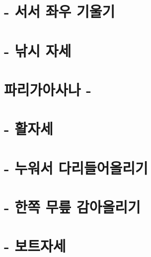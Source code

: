 \documentclass[12pt, a4paper, oneside]{book}
\let\stdsection\section
\renewcommand\section{\newpage\stdsection}
\begin{document}
%
%
%
	\section{ - 서서 좌우 기울기 }

%
%
%
	\section{ - 낚시 자세 }

%
%
%
	\section{파리가아사나 - }



%
%
%
	\section{ - 활자세}

%
%
%
	\section{ - 누워서 다리들어올리기}

%
%
%
	\section{ - 한쪽 무릎 감아올리기}

%
%
%
	\section{ - 보트자세}
\end{document}
